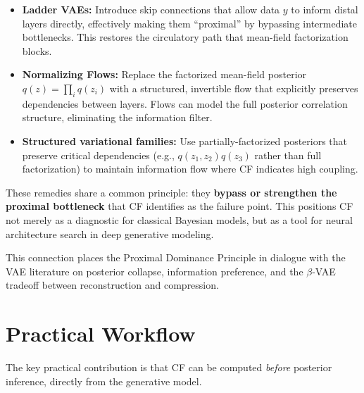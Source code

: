 \documentclass[10pt]{article} %
\theoremstyle{plain}
\theoremstyle{definition}
\begin{document}
\begin{itemize}
    \item \textbf{Ladder VAEs:} Introduce skip connections that allow data $y$ to inform distal layers directly, effectively making them ``proximal'' by bypassing intermediate bottlenecks. This restores the circulatory path that mean-field factorization blocks.
    
    \item \textbf{Normalizing Flows:} Replace the factorized mean-field posterior $q(z) = \prod_i q(z_i)$ with a structured, invertible flow that explicitly preserves dependencies between layers. Flows can model the full posterior correlation structure, eliminating the information filter.
    
    \item \textbf{Structured variational families:} Use partially-factorized posteriors that preserve critical dependencies (e.g., $q(z_1, z_2)q(z_3)$ rather than full factorization) to maintain information flow where CF indicates high coupling.
\end{itemize}

\noindent These remedies share a common principle: they \textbf{bypass or strengthen the proximal bottleneck} that CF identifies as the failure point. This positions CF not merely as a diagnostic for classical Bayesian models, but as a tool for neural architecture search in deep generative modeling.

This connection places the Proximal Dominance Principle in dialogue with the VAE literature on posterior collapse, information preference, and the $\beta$-VAE tradeoff between reconstruction and compression.

\section{Practical Workflow}
\label{sec:workflow}

The key practical contribution is that CF can be computed \emph{before} posterior inference, directly from the generative model.
\end{document}
